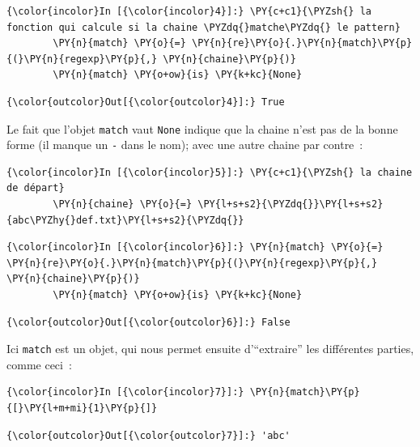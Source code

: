     \begin{Verbatim}[commandchars=\\\{\}]
{\color{incolor}In [{\color{incolor}4}]:} \PY{c+c1}{\PYZsh{} la fonction qui calcule si la chaine \PYZdq{}matche\PYZdq{} le pattern}
        \PY{n}{match} \PY{o}{=} \PY{n}{re}\PY{o}{.}\PY{n}{match}\PY{p}{(}\PY{n}{regexp}\PY{p}{,} \PY{n}{chaine}\PY{p}{)}
        \PY{n}{match} \PY{o+ow}{is} \PY{k+kc}{None}
\end{Verbatim}


\begin{Verbatim}[commandchars=\\\{\}]
{\color{outcolor}Out[{\color{outcolor}4}]:} True
\end{Verbatim}
            
    Le fait que l'objet \texttt{match} vaut \texttt{None} indique que la
chaine n'est pas de la bonne forme (il manque un \texttt{-} dans le
nom); avec une autre chaine par contre~:

    \begin{Verbatim}[commandchars=\\\{\}]
{\color{incolor}In [{\color{incolor}5}]:} \PY{c+c1}{\PYZsh{} la chaine de départ}
        \PY{n}{chaine} \PY{o}{=} \PY{l+s+s2}{\PYZdq{}}\PY{l+s+s2}{abc\PYZhy{}def.txt}\PY{l+s+s2}{\PYZdq{}}
\end{Verbatim}


    \begin{Verbatim}[commandchars=\\\{\}]
{\color{incolor}In [{\color{incolor}6}]:} \PY{n}{match} \PY{o}{=} \PY{n}{re}\PY{o}{.}\PY{n}{match}\PY{p}{(}\PY{n}{regexp}\PY{p}{,} \PY{n}{chaine}\PY{p}{)}
        \PY{n}{match} \PY{o+ow}{is} \PY{k+kc}{None}
\end{Verbatim}


\begin{Verbatim}[commandchars=\\\{\}]
{\color{outcolor}Out[{\color{outcolor}6}]:} False
\end{Verbatim}
            
    Ici \texttt{match} est un objet, qui nous permet ensuite d'``extraire''
les différentes parties, comme ceci~:

    \begin{Verbatim}[commandchars=\\\{\}]
{\color{incolor}In [{\color{incolor}7}]:} \PY{n}{match}\PY{p}{[}\PY{l+m+mi}{1}\PY{p}{]}
\end{Verbatim}


\begin{Verbatim}[commandchars=\\\{\}]
{\color{outcolor}Out[{\color{outcolor}7}]:} 'abc'
\end{Verbatim}
            
